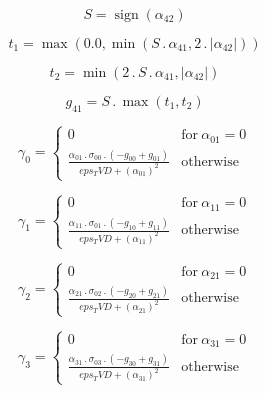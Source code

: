 \documentclass{article}
\begin{document}
\begin{dmath}S = \operatorname{sign}{\left (\alpha_{42} \right )}\end{dmath}

\begin{dmath}t_{1} = \max\left(0.0, \min\left(S \,.\, \alpha_{41}, 2 \,.\, \left|{\alpha_{42}}\right|\right)\right)\end{dmath}

\begin{dmath}t_{2} = \min\left(2 \,.\, S \,.\, \alpha_{41}, \left|{\alpha_{42}}\right|\right)\end{dmath}

\begin{dmath}g_{41} = S \,.\, \max\left(t_{1}, t_{2}\right)\end{dmath}

\begin{dmath}\gamma_{0} = \begin{cases} 0 & \text{for}\: \alpha_{01} = 0 \\\frac{\alpha_{01} \,.\, \sigma_{0 0} \,.\, \left(- g_{00} + g_{01}\right)}{eps_TVD + \left(\alpha_{01} \right)^{2}} & \text{otherwise} \end{cases}\end{dmath}

\begin{dmath}\gamma_{1} = \begin{cases} 0 & \text{for}\: \alpha_{11} = 0 \\\frac{\alpha_{11} \,.\, \sigma_{0 1} \,.\, \left(- g_{10} + g_{11}\right)}{eps_TVD + \left(\alpha_{11} \right)^{2}} & \text{otherwise} \end{cases}\end{dmath}

\begin{dmath}\gamma_{2} = \begin{cases} 0 & \text{for}\: \alpha_{21} = 0 \\\frac{\alpha_{21} \,.\, \sigma_{0 2} \,.\, \left(- g_{20} + g_{21}\right)}{eps_TVD + \left(\alpha_{21} \right)^{2}} & \text{otherwise} \end{cases}\end{dmath}

\begin{dmath}\gamma_{3} = \begin{cases} 0 & \text{for}\: \alpha_{31} = 0 \\\frac{\alpha_{31} \,.\, \sigma_{0 3} \,.\, \left(- g_{30} + g_{31}\right)}{eps_TVD + \left(\alpha_{31} \right)^{2}} & \text{otherwise} \end{cases}\end{dmath}
\end{document}
